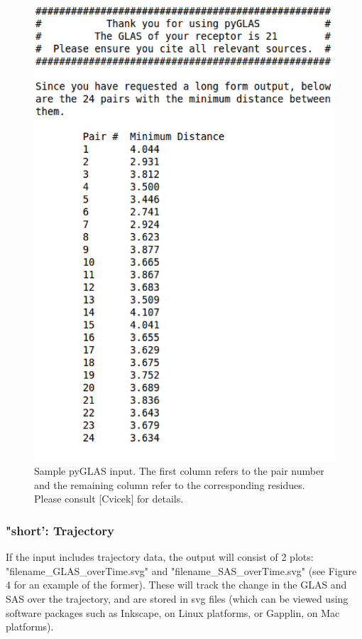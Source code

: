 \documentclass[12pt]{article}
\begin{document}
\begin{figure}[!ht]
	\centering
	\includegraphics[scale=0.8]{Receptor_GPCRDB_GLAS_long.png}
	\caption{Sample pyGLAS input. The first column refers to the pair number and the remaining column refer to the corresponding residues. Please consult [Cvicek] for details.}
\end{figure}

\subsubsection{"short': Trajectory}
If the input includes trajectory data, the output will consist of 2 plots: "filename\_GLAS\_overTime.svg" and "filename\_SAS\_overTime.svg" (see Figure 4 for an example of the former). These will track the change in the GLAS and SAS over the trajectory, and are stored in svg files (which can be viewed using software packages such as Inkscape, on Linux platforms, or Gapplin, on Mac platforms).
\end{document}
